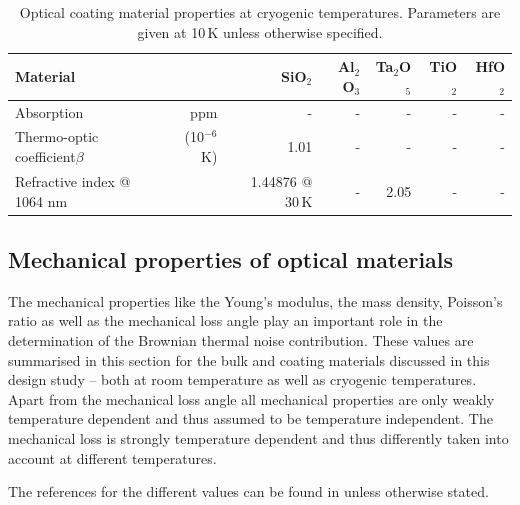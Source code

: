 \begin{table}[h!]
\begin{center}
\begin{tabular}{|l r||r|r|r|r|r|}
  \hline
    {\large\strut} Material  & & SiO$_2$ & Al$_2$O$_3$ & Ta$_2$O$_5$ & TiO$_2$ & HfO$_2$ \\
  \hline
  \hline
   {\large\strut} Absorption & ppm & - & - & - & - & - \\
   {\large\strut} \parbox{0.1\linewidth} {Thermo-optic \\ coefficient$\beta$}  & (10$^{-6}$K) &  1.01 & - & - & -& -  \\
   {\large\strut} Refractive index @ 1064 nm & & 1.44876 @ 30\,K & - & 2.05 & - & -\\
  \hline
\end{tabular}
\caption{Optical coating material properties at cryogenic temperatures. Parameters are given at 10\,K unless otherwise specified.}
\end{center}
\label{tab:Optic_Coat_Param_cryo}
\end{table}

\FloatBarrier
\subsection{Mechanical properties of optical materials}\label{app:mechdat}

The mechanical properties like the Young's modulus, the mass density, Poisson's ratio as well as the mechanical loss angle play an important role in the determination of the Brownian thermal noise contribution. These values are summarised in this section for the bulk and coating materials discussed in this design study -- both at room temperature as well as cryogenic temperatures. Apart from the mechanical loss angle all mechanical properties are only weakly temperature dependent and thus assumed to be temperature independent. The mechanical loss is strongly temperature dependent and thus differently taken into account at different temperatures.

The references for the different values can be found in \cite{Franc2009, Nawrodt2009_ET} unless otherwise stated.

